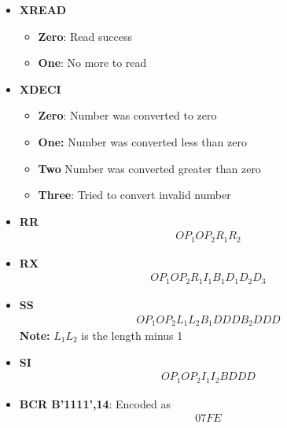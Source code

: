 \documentclass{report}
\begin{document}
\begin{itemize}
\begin{itemize}
            \end{itemize}
        \item \textbf{XREAD}
            \begin{itemize}
                \item \textbf{Zero}: Read success
                \item \textbf{One}: No more to read
            \end{itemize}
        \item \textbf{XDECI}
            \begin{itemize}
                \item \textbf{Zero}: Number was converted to zero
                \item \textbf{One:} Number was converted less than zero
                \item \textbf{Two} Number was converted greater than zero
                \item \textbf{Three}: Tried to convert invalid number
            \end{itemize}

    \end{itemize}

    \pagebreak 
    \begin{itemize}
        \item \textbf{RR}
            \begin{align*}
                OP_{1}OP_{2}R_{1}R_{2}
            \end{align*}
        \item \textbf{RX}
            \begin{align*}
                OP_{1}OP_{2}R_{1}I_{1}B_{1}D_{1}D_{2}D_{3}
            \end{align*}
        \item \textbf{SS}
            \begin{align*}
                OP_{1}OP_{2}L_{1}L_{2}B_{1}DDDB_{2}DDD
            \end{align*}
            \textbf{Note:} $L_{1}L_{2}$ is the length minus 1
        \item \textbf{SI}
            \begin{align*}
                OP_{1}OP_{2}I_{1}I_{2}BDDD
            \end{align*}
        \item \textbf{BCR B'1111',14}: Encoded as
            \begin{align*}
                07FE
            \end{align*}
    \end{itemize}


    \pagebreak 
    \bigbreak \noindent 

    \bigbreak \noindent 
\end{document}
